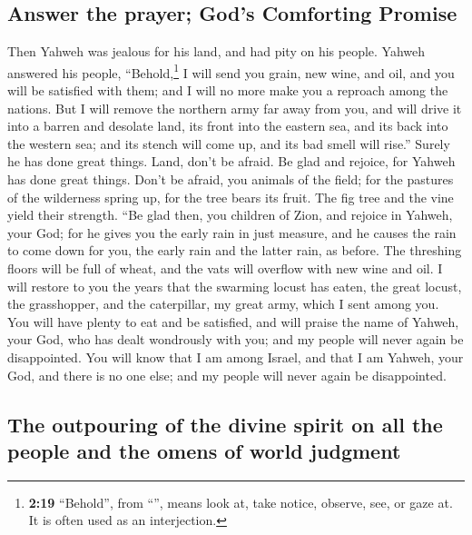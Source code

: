 \hypertarget{answer-the-prayer-gods-comforting-promise}{%
\subsection{Answer the prayer; God's Comforting
Promise}\label{answer-the-prayer-gods-comforting-promise}}

 Then Yahweh was jealous for his land, and had pity on
his people.  Yahweh answered his people,
``Behold,\footnote{\textbf{2:19} ``Behold'', from ``'',
  means look at, take notice, observe, see, or gaze at. It is often used
  as an interjection.} I will send you grain, new wine, and oil, and you
will be satisfied with them; and I will no more make you a reproach
among the nations.  But I will remove the northern army
far away from you, and will drive it into a barren and desolate land,
its front into the eastern sea, and its back into the western sea; and
its stench will come up, and its bad smell will rise.'' Surely he has
done great things.  Land, don't be afraid. Be glad and
rejoice, for Yahweh has done great things.  Don't be
afraid, you animals of the field; for the pastures of the wilderness
spring up, for the tree bears its fruit. The fig tree and the vine yield
their strength.  ``Be glad then, you children of Zion,
and rejoice in Yahweh, your God; for he gives you the early rain in just
measure, and he causes the rain to come down for you, the early rain and
the latter rain, as before.  The threshing floors will be
full of wheat, and the vats will overflow with new wine and oil.
 I will restore to you the years that the swarming locust
has eaten, the great locust, the grasshopper, and the caterpillar, my
great army, which I sent among you.  You will have plenty
to eat and be satisfied, and will praise the name of Yahweh, your God,
who has dealt wondrously with you; and my people will never again be
disappointed.  You will know that I am among Israel, and
that I am Yahweh, your God, and there is no one else; and my people will
never again be disappointed.

\hypertarget{the-outpouring-of-the-divine-spirit-on-all-the-people-and-the-omens-of-world-judgment}{%
\subsection{The outpouring of the divine spirit on all the people and
the omens of world
judgment}\label{the-outpouring-of-the-divine-spirit-on-all-the-people-and-the-omens-of-world-judgment}}

